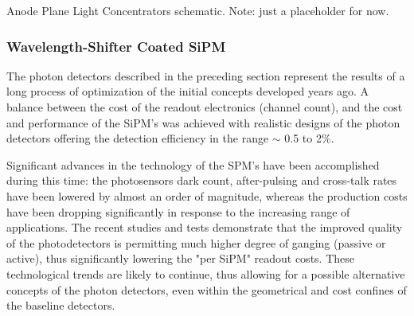 
{Anode Plane Light Concentrators schematic. Note: just a placeholder for now.}



\subsubsection{Wavelength-Shifter Coated SiPM} 
The photon detectors described in the preceding section represent the results of a long process of optimization of the initial concepts developed years ago. A balance between the cost of the readout electronics (channel count), and the cost and performance of the SiPM's was achieved with realistic designs of the photon detectors offering the detection efficiency in the range $\sim$ 0.5 to 2\%.
 
Significant advances in the technology of the SPM's have been accomplished during this time: the photosensors dark count, after-pulsing and cross-talk rates have been lowered by almost an order of magnitude, whereas the production costs have been dropping significantly in response to the increasing range of applications.  The recent studies and tests demonstrate that the improved quality of the photodetectors is permitting much higher degree of ganging (passive or active), thus significantly lowering the "per SiPM" readout costs.
These technological trends are likely to continue, thus allowing for a possible alternative concepts of the photon detectors, even within the geometrical and cost confines of the baseline detectors.

